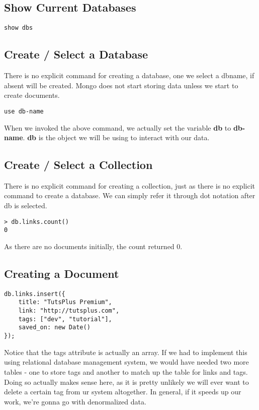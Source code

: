 \documentclass[a4paper, 12pt]{article}
\begin{document}
\subsection{Show Current Databases}
\begin{verbatim}
show dbs
\end{verbatim}
\subsection{Create / Select a Database}
There is no explicit command for creating a database, one we select a dbname, if absent will be created. Mongo does not start storing data unless we start to create documents.
\begin{verbatim}
use db-name
\end{verbatim}
When we invoked the above command, we actually set the variable \textbf{db} to \textbf{db-name}. \textbf{db} is the object we will be using to interact with our data.
\subsection{Create / Select a Collection}
There is no explicit command for creating a collection, just as there is no explicit command to create a database. We can simply refer it through dot notation after db is selected.
\begin{verbatim}
> db.links.count()
0
\end{verbatim}
As there are no documents initially, the count returned 0.
\subsection{Creating a Document}
\begin{verbatim}
db.links.insert({
    title: "TutsPlus Premium",
    link: "http://tutsplus.com",
    tags: ["dev", "tutorial"],
    saved_on: new Date()
});
\end{verbatim}
Notice that the tags attribute is actually an array. If we had to implement this using relational database management system, we would have needed two more tables - one to store tags and another to match up the table for links and tags. Doing so actually makes sense here, as it is pretty unlikely we will ever want to delete a certain tag from ur system altogether. In general, if it speeds up our work, we're gonna go with denormalized data.
\end{document}
